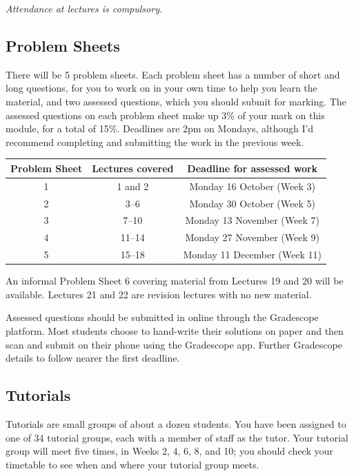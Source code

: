 \documentclass[
  a4paper,
]{book}
\theoremstyle{definition}
\theoremstyle{definition}
\theoremstyle{definition}
\theoremstyle{definition}
\theoremstyle{remark}
\begin{document}
\emph{Attendance at lectures is compulsory.}

\hypertarget{problem-sheets}{%
\subsection*{Problem Sheets}\label{problem-sheets}}

There will be 5 problem sheets. Each problem sheet has a number of short and long questions, for you to work on in your own time to help you learn the material, and two assessed questions, which you should submit for marking. The assessed questions on each problem sheet make up 3\% of your mark on this module, for a total of 15\%. Deadlines are 2pm on Mondays, although I'd recommend completing and submitting the work in the previous week.

\begin{longtable}[]{@{}ccc@{}}
\toprule()
Problem Sheet & Lectures covered & Deadline for assessed work \\
\midrule()
\endhead
1 & 1 and 2 & Monday 16 October (Week 3) \\
2 & 3--6 & Monday 30 October (Week 5) \\
3 & 7--10 & Monday 13 November (Week 7) \\
4 & 11--14 & Monday 27 November (Week 9) \\
5 & 15--18 & Monday 11 December (Week 11) \\
\bottomrule()
\end{longtable}

An informal Problem Sheet 6 covering material from Lectures 19 and 20 will be available. Lectures 21 and 22 are revision lectures with no new material.

Assessed questions should be submitted in online through the Gradescope platform. Most students choose to hand-write their solutions on paper and then scan and submit on their phone using the Gradescope app. Further Gradescope details to follow nearer the first deadline.

\hypertarget{tutorials}{%
\subsection*{Tutorials}\label{tutorials}}

Tutorials are small groups of about a dozen students. You have been assigned to one of 34 tutorial groups, each with a member of staff as the tutor. Your tutorial group will meet five times, in Weeks 2, 4, 6, 8, and 10; you should check your timetable to see when and where your tutorial group meets.
\end{document}
